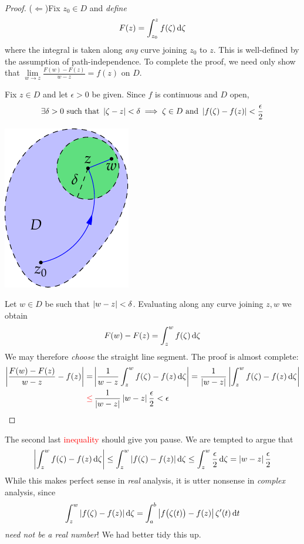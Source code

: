 \begin{proof}
\begin{minipage}[t]{0.75\linewidth}\vspace{0pt}
($\Leftarrow$)\quad Fix $z_0\in D$ and \emph{define}
\[F(z)=\int_{z_0}^zf(\zeta)\,\mathrm{d}\zeta\]
where the integral is taken along \emph{any} curve joining $z_0$ to $z$. This is well-defined by the assumption of path-independence. To complete the proof, we need only show that $\lim\limits_{w\to z}\frac{F(w)-F(z)}{w-z}=f(z)$ on $D$.\par
Fix $z\in D$ and let $\epsilon>0$ be given. Since $f$ is continuous and $D$ open,
\[\exists \delta>0\ \text{such that}\  \nm{\zeta-z}<\delta\implies \zeta\in D\ \text{and}\ \nm{f(\zeta)-f(z)}<\frac\epsilon 2\]
\end{minipage}\begin{minipage}[t]{0.25\linewidth}\vspace{-10pt}
\flushright\includegraphics{ftc-2}
\end{minipage}\bigbreak
Let $w\in D$ be such that $\left| w-z\right|<\delta$. Evaluating along any curve joining $z,w$ we obtain
\[F(w)-F(z)=\int_z^wf(\zeta)\,\mathrm{d}\zeta\]
We may therefore \emph{choose} the straight line segment. The proof is almost complete:
\begin{align*}
\left| \frac{F(w)-F(z)}{w-z}-f(z)\right|=&\left| \frac 1{w-z}\int_z^wf(\zeta)-f(z)\,\mathrm{d}\zeta\right| = \frac 1{\left| w-z\right|}\left| \int_z^wf(\zeta)-f(z)\,\mathrm{d}\zeta\right|\\
\textcolor{red}{\le}&\,\frac 1{\left| w-z\right|}\left| w-z\right|\frac\epsilon 2<\epsilon \tag*{\qedhere}
\end{align*}
\end{proof}

The second last \textcolor{red}{inequality} should give you pause. We are tempted to argue that
\[\left| \int_z^wf(\zeta)-f(z)\,\mathrm{d}\zeta\right| \le \int_z^w\left| f(\zeta)-f(z)\right|\mathrm{d}\zeta \le \int_z^w\frac\epsilon 2\,\mathrm{d}\zeta =\left| w-z\right|\frac\epsilon 2\]
While this makes perfect sense in \emph{real} analysis, it is utter nonsense in \emph{complex} analysis, since
\[\int_z^w\left| f(\zeta)-f(z)\right|\mathrm{d}\zeta=\int_a^b\left| f\bigl(\zeta(t)\bigr)-f(z)\right|\zeta'(t)\,{\mathrm{d} t}\]
\emph{need not be a real number}! We had better tidy this up.
\goodbreak


